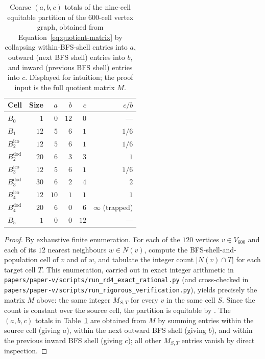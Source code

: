 \documentclass[11pt, a4paper]{amsart}
\theoremstyle{definition}
\begin{document}
\begin{table}[ht]
\centering
\caption{Coarse $(a, b, c)$ totals of the nine-cell equitable
partition of the $600$-cell vertex graph, obtained from
Equation~\eqref{eq:quotient-matrix} by collapsing within-BFS-shell
entries into $a$, outward (next BFS shell) entries into $b$, and
inward (previous BFS shell) entries into $c$. Displayed for
intuition; the proof input is the full quotient matrix
$M$.}
\label{tab:P2-populations}
\begin{tabular}{@{}lrrrrr@{}}
\toprule
Cell & Size & $a$ & $b$ & $c$ & $c/b$ \\
\midrule
$B_0$                  & $1$  & $0$  & $12$ & $0$  & --- \\
$B_1$                  & $12$ & $5$  & $6$  & $1$  & $1/6$ \\
$B_2^{\mathrm{ico}}$   & $12$ & $5$  & $6$  & $1$  & $1/6$ \\
$B_2^{\mathrm{dod}}$   & $20$ & $6$  & $3$  & $3$  & $1$ \\
$B_3^{\mathrm{ico}}$   & $12$ & $5$  & $6$  & $1$  & $1/6$ \\
$B_3^{\mathrm{dod}}$   & $30$ & $6$  & $2$  & $4$  & $2$ \\
$B_4^{\mathrm{ico}}$   & $12$ & $10$ & $1$  & $1$  & $1$ \\
$B_4^{\mathrm{dod}}$   & $20$ & $6$  & $0$  & $6$  & $\infty$ (trapped) \\
$B_5$                  & $1$  & $0$  & $0$  & $12$ & --- \\
\bottomrule
\end{tabular}
\end{table}

\begin{proof}
By exhaustive finite enumeration. For each of the $120$ vertices
$v \in V_{600}$ and each of its $12$ nearest neighbours $w \in
N(v)$, compute the BFS-shell-and-population cell of $v$ and of
$w$, and tabulate the integer count $|N(v) \cap T|$ for each
target cell $T$. This enumeration, carried out in exact integer
arithmetic in
\verb|papers/paper-v/scripts/run_rd4_exact_rational.py| (and
cross-checked in
\verb|papers/paper-v/scripts/run_rigorous_verification.py|),
yields precisely the matrix $M$ above: the same integer
$M_{S, T}$ for every $v$ in the same cell $S$. Since the count is
constant over the source cell, the partition is equitable by
\cite[\S 9.3]{GodsilRoyle2001}. The $(a, b, c)$ totals in
Table~\ref{tab:P2-populations} are obtained from $M$ by summing
entries within the source cell (giving $a$), within the next
outward BFS shell (giving $b$), and within the previous inward
BFS shell (giving $c$); all other $M_{S, T}$ entries vanish by
direct inspection.
\end{proof}
\end{document}
